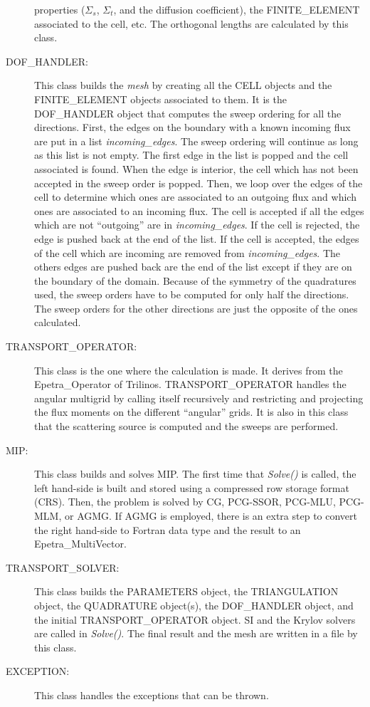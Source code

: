 \begin{description}
    properties ($\Sigma_s$, $\Sigma_t$, and the diffusion coefficient), 
    the FINITE\_ELEMENT associated to the cell, etc. The orthogonal lengths are
    calculated by this class.
  \item[DOF\_HANDLER:] This class builds the \emph{mesh} by creating all the 
    CELL objects and the  FINITE\_ELEMENT objects associated to them. It is 
    the DOF\_HANDLER object that computes the sweep
    ordering for all the directions. First, the edges on the boundary with a
    known incoming flux are put in a list \emph{incoming\_edges}. The sweep
    ordering will continue as long as this list is not empty. The first edge 
    in the list is popped and the cell associated is found. When the edge is 
    interior, the cell which has not been accepted in the sweep order is popped.
    Then, we loop over the edges of the cell to determine which ones are
    associated to an outgoing flux and which ones are associated to an
    incoming flux. The cell is accepted if all the
    edges which are not ``outgoing'' are in \emph{incoming\_edges}. If the cell is
    rejected, the edge is pushed back at the end of the list. If the cell is
    accepted, the edges of the cell which are incoming are removed from
    \emph{incoming\_edges}. The others edges are pushed back are the end of the
    list except if they are on the boundary of the domain. Because of the 
    symmetry of the quadratures used, the sweep orders have to be computed 
    for only half the directions. The sweep orders for the other directions 
    are just the opposite of the ones calculated.
  \item[TRANSPORT\_OPERATOR:] This class is the one where the calculation is
    made. It derives from the Epetra\_Operator of Trilinos.
    TRANSPORT\_OPERATOR handles the angular multigrid by calling itself
    recursively and restricting and projecting the flux moments on the
    different ``angular'' grids. It is also in this class that the scattering 
    source is computed and the sweeps are  performed. 
  \item[MIP:] This class builds and solves MIP. The first time that
    \emph{Solve()} is called, the left hand-side is built and stored using a 
    compressed row storage format (CRS). Then, the problem is
    solved by CG, PCG-SSOR, PCG-MLU, PCG-MLM, or AGMG. If AGMG is employed, 
    there is an extra step to convert the right hand-side to Fortran data type 
    and the  result to an Epetra\_MultiVector.
  \item[TRANSPORT\_SOLVER:] This class builds the PARAMETERS object, the
    TRIANGULATION object, the QUADRATURE object(s), the DOF\_HANDLER object,
    and the initial TRANSPORT\_OPERATOR object. SI and the Krylov solvers are
    called in \emph{Solve()}. The final result and the mesh are written in a file
    by this class.
  \item[EXCEPTION:] This class handles the exceptions that can be thrown.
\end{description}

